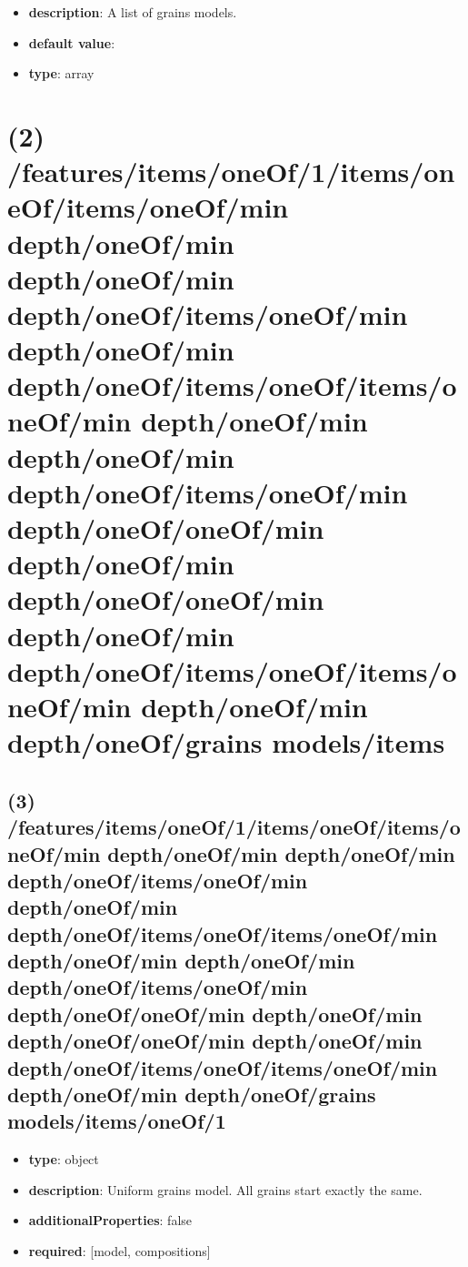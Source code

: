 \begin{itemize}[leftmargin=1em]\item {\bf description}: A list of grains models.
\item {\bf default value}: 
\item {\bf type}: array
\end{itemize}\section{(2) /features/items/oneOf/1/items/oneOf/items/oneOf/min depth/oneOf/min depth/oneOf/min depth/oneOf/items/oneOf/min depth/oneOf/min depth/oneOf/items/oneOf/items/oneOf/min depth/oneOf/min depth/oneOf/min depth/oneOf/items/oneOf/min depth/oneOf/oneOf/min depth/oneOf/min depth/oneOf/oneOf/min depth/oneOf/min depth/oneOf/items/oneOf/items/oneOf/min depth/oneOf/min depth/oneOf/grains models/items}

\subsection{(3) /features/items/oneOf/1/items/oneOf/items/oneOf/min depth/oneOf/min depth/oneOf/min depth/oneOf/items/oneOf/min depth/oneOf/min depth/oneOf/items/oneOf/items/oneOf/min depth/oneOf/min depth/oneOf/min depth/oneOf/items/oneOf/min depth/oneOf/oneOf/min depth/oneOf/min depth/oneOf/oneOf/min depth/oneOf/min depth/oneOf/items/oneOf/items/oneOf/min depth/oneOf/min depth/oneOf/grains models/items/oneOf/1}
\begin{itemize}[leftmargin=3em]\item {\bf type}: object
\item {\bf description}: Uniform grains model. All grains start exactly the same.
\item {\bf additionalProperties}: false
\item {\bf required}: [model, compositions]\end{itemize}
